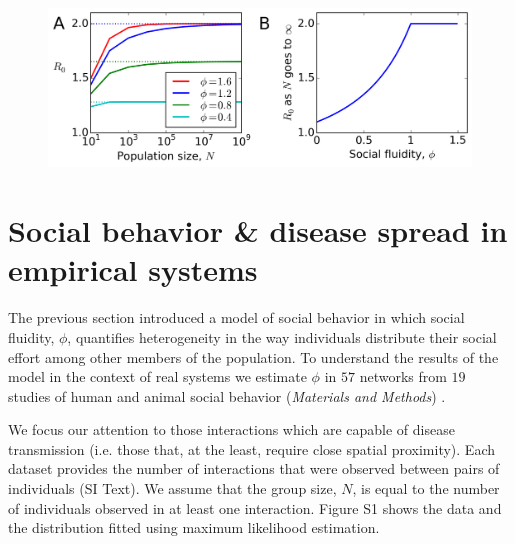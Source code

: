 \documentclass[twocolumn,8pt]{article}
\begin{document}
\begin{figure}[h!]
\centering
\includegraphics[width=\linewidth]{Figures/disease_theory.png}
\label{disease_theory}
\end{figure}
\section*{Social behavior \& disease spread in empirical systems}
The previous section introduced a model of social behavior in which social fluidity, $\phi$, quantifies heterogeneity in the way individuals distribute their social effort among other members of the population. To understand the results of the model in the context of real systems we estimate $\phi$ in $57$ networks from $19$ studies of human and animal social behavior (\emph{Materials and Methods}) \cite{isella2011s,
10.1371/journal.pone.0023176,
10.1371/journal.pone.0136497,
10.1371/journal.pone.0073970,
10.1371/journal.pone.0020298,
Carter20122573,
Davis20141004,
Grant1973449,
levin2016stress,
sailer1984proximity,
mourier2017learning,
massen2013stability,
sade1972sociometrics,
butovskaya1994structure,
takahata1991diachronic,
hass1991social,
lott1979dominance,
SCHEIN195545,
hobson2015social}. 

We focus our attention to those interactions which are capable of disease transmission (i.e. those that, at the least, require close spatial proximity). Each dataset provides the number of interactions that were observed between pairs of individuals (SI Text). We assume that the group size, $N$, is equal to the number of individuals observed in at least one interaction. Figure S1 shows the data and the distribution fitted using maximum likelihood estimation. 
\end{document}
